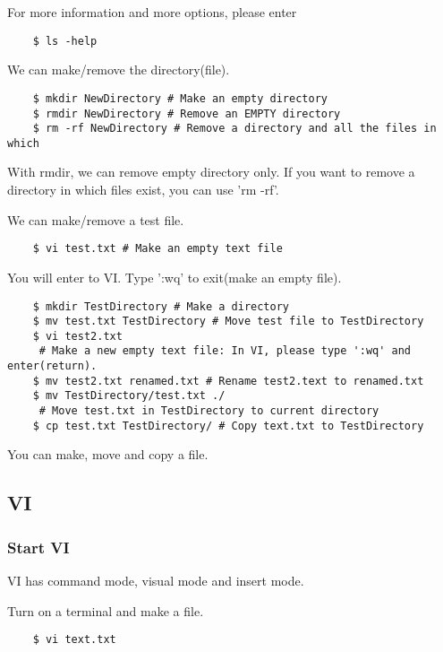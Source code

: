 For more information and more options, please enter

\begin{verbatim}
    $ ls -help
\end{verbatim}

We can make/remove the directory(file).

\begin{verbatim}
    $ mkdir NewDirectory # Make an empty directory
    $ rmdir NewDirectory # Remove an EMPTY directory
    $ rm -rf NewDirectory # Remove a directory and all the files in which
\end{verbatim}

With rmdir, we can remove empty directory only. If you want to remove a directory in which files exist, you can use 'rm -rf'.

We can make/remove a test file.

\begin{verbatim}
    $ vi test.txt # Make an empty text file
\end{verbatim}

You will enter to VI. Type ':wq' to exit(make an empty file).

\begin{verbatim}
    $ mkdir TestDirectory # Make a directory
    $ mv test.txt TestDirectory # Move test file to TestDirectory
    $ vi test2.txt
     # Make a new empty text file: In VI, please type ':wq' and enter(return).
    $ mv test2.txt renamed.txt # Rename test2.text to renamed.txt
    $ mv TestDirectory/test.txt ./
     # Move test.txt in TestDirectory to current directory
    $ cp test.txt TestDirectory/ # Copy text.txt to TestDirectory
\end{verbatim}

You can make, move and copy a file.

\subsection{VI}

\subsubsection{Start VI}

VI has command mode, visual mode and insert mode.

Turn on a terminal and make a file.

\begin{verbatim}
    $ vi text.txt
\end{verbatim}

